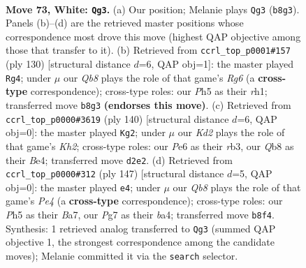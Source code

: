 \documentclass[11pt]{article}
\begin{document}
\clearpage

\begin{figure}[p]\centering
\begin{subfigure}{0.46\textwidth}\centering
\resizebox{\linewidth}{!}{%
\newchessgame
\chessboard[
  setfen={1Q6/6P1/4P3/2k4P/8/8/3K4/8 w - - 3 73},
  showmover=false,
  pgfstyle=straightmove, color=movearrow, markmove={b8-g3}
]}
\caption{}
\end{subfigure}\hfill
\begin{subfigure}{0.46\textwidth}\centering
\resizebox{\linewidth}{!}{%
\newchessgame
\chessboard[
  setfen={8/8/6R1/4k3/2P5/8/P4K2/7r w - - 1 66},
  showmover=false,
  pgfstyle=straightmove, color=movearrow, markmove={g6-g4}
]}
\caption{}
\end{subfigure}
\\[4pt]
\begin{subfigure}{0.46\textwidth}\centering
\resizebox{\linewidth}{!}{%
\newchessgame
\chessboard[
  setfen={7k/8/8/8/4B1PP/1r6/7K/8 w - - 1 71},
  showmover=false,
  pgfstyle=straightmove, color=movearrow, markmove={h2-g2}
]}
\caption{}
\end{subfigure}\hfill
\begin{subfigure}{0.46\textwidth}\centering
\resizebox{\linewidth}{!}{%
\newchessgame
\chessboard[
  setfen={8/b1p5/8/4p3/B7/2K2k2/8/8 b - - 1 74},
  showmover=false,
  pgfstyle=straightmove, color=movearrow, markmove={e5-e4}
]}
\caption{}
\end{subfigure}
\caption{\textbf{Move 73, White: \texttt{Qg3}.} (a) Our position; Melanie plays \texttt{Qg3} (\texttt{b8g3}). Panels (b)--(d) are the retrieved master positions whose correspondence most drove this move (highest QAP objective among those that transfer to it). (b) Retrieved from \texttt{ccrl\_top\_p0001\#157} (ply 130) [structural distance $d$=6, QAP obj=1]: the master played \texttt{Rg4}; under $\mu$ our \emph{Qb8} plays the role of that game's \emph{Rg6} (a \textbf{cross-type} correspondence); cross-type roles: our \emph{P}h5 as their \emph{r}h1; transferred move \texttt{b8g3} \textbf{(endorses this move)}. (c) Retrieved from \texttt{ccrl\_top\_p0000\#3619} (ply 140) [structural distance $d$=6, QAP obj=0]: the master played \texttt{Kg2}; under $\mu$ our \emph{Kd2} plays the role of that game's \emph{Kh2}; cross-type roles: our \emph{P}e6 as their \emph{r}b3, our \emph{Q}b8 as their \emph{B}e4; transferred move \texttt{d2e2}. (d) Retrieved from \texttt{ccrl\_top\_p0000\#312} (ply 147) [structural distance $d$=5, QAP obj=0]: the master played \texttt{e4}; under $\mu$ our \emph{Qb8} plays the role of that game's \emph{Pe4} (a \textbf{cross-type} correspondence); cross-type roles: our \emph{P}h5 as their \emph{B}a7, our \emph{P}g7 as their \emph{b}a4; transferred move \texttt{b8f4}. Synthesis: 1 retrieved analog transferred to \texttt{Qg3} (summed QAP objective 1, the strongest correspondence among the candidate moves); Melanie committed it via the \texttt{search} selector.}
\label{fig:thought-m144}
\end{figure}
\end{document}
